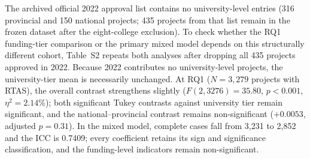 \documentclass[11pt]{article}
\begin{document}

The archived official 2022 approval list contains no university-level entries (316 provincial and 150 national projects; 435 projects from that list remain in the frozen dataset after the eight-college exclusion). To check whether the RQ1 funding-tier comparison or the primary mixed model depends on this structurally different cohort, Table~S2 repeats both analyses after dropping all 435 projects approved in 2022. Because 2022 contributes no university-level projects, the university-tier mean is necessarily unchanged. At RQ1 ($N=3{,}279$ projects with RTAS), the overall contrast strengthens slightly ($F(2,3276)=35.80$, $p<0.001$, $\eta^2=2.14\%$); both significant Tukey contrasts against university tier remain significant, and the national--provincial contrast remains non-significant ($+0.0053$, adjusted $p=0.31$). In the mixed model, complete cases fall from 3,231 to 2,852 and the ICC is 0.7409; every coefficient retains its sign and significance classification, and the funding-level indicators remain non-significant.
\end{document}

